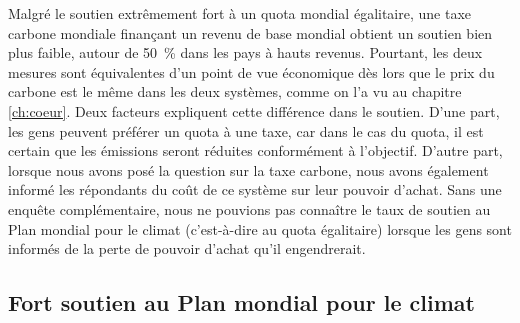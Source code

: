 \documentclass[a5paper,french]{memoir}
\begin{document}
Malgré le soutien extrêmement fort à un quota mondial égalitaire, une taxe carbone mondiale finançant un revenu de base mondial obtient un soutien bien plus faible, autour de 50~\% dans les pays à hauts revenus. Pourtant, les deux mesures sont équivalentes d'un point de vue économique dès lors que le prix du carbone est le même dans les deux systèmes, comme on l'a vu au chapitre \ref{ch:coeur}. Deux facteurs expliquent cette différence dans le soutien. D'une part, les gens peuvent préférer un quota à une taxe, car dans le cas du quota, il est certain que les émissions seront réduites conformément à l'objectif. D'autre part, lorsque nous avons posé la question sur la taxe carbone, nous avons également informé les répondants du coût de ce système sur leur pouvoir d'achat. Sans une enquête complémentaire, nous ne pouvions pas connaître le taux de soutien au Plan mondial pour le climat (c'est-à-dire au quota égalitaire) lorsque les gens sont informés de la perte de pouvoir d'achat qu'il engendrerait.  



\subsection{Fort soutien au Plan mondial pour le climat}
\end{document}
